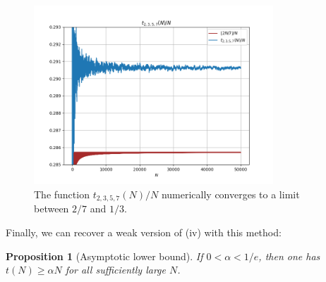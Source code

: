 \documentclass[12pt,a4paper,reqno]{amsart}
\numberwithin{equation}{section}
\theoremstyle{plain}
\newtheorem{proposition}[theorem]{Proposition}
\theoremstyle{definition}
\begin{document}
\begin{figure}
  \centering
  \includegraphics[width=0.8\textwidth]{t7.png}
  \vspace{-8pt}
  \caption{The function $t_{2,3,5,7}(N)/N$ numerically converges to a limit between $2/7$ and $1/3$.}\label{fig-t7}
\end{figure}

Finally, we can recover a weak version of (iv) with this method:

\begin{proposition}[Asymptotic lower bound]\label{asymp}  If $0 < \alpha < 1/e$, then one has $t(N) \geq \alpha N$ for all sufficiently large $N$.
\end{proposition}
\end{document}
